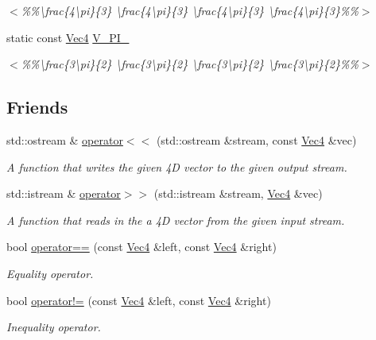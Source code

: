 \begin{DoxyCompactItemize}
\begin{DoxyCompactList}\small\item\em $<$\%\%\textbackslash{}frac\{4\textbackslash{}pi\}\{3\} \textbackslash{}frac\{4\textbackslash{}pi\}\{3\} \textbackslash{}frac\{4\textbackslash{}pi\}\{3\} \textbackslash{}frac\{4\textbackslash{}pi\}\{3\}\%\%$>$ \end{DoxyCompactList}\item 
\hypertarget{classgfxmath_1_1_vec4_a8e5758b556bdb951580e477b23d00223}{}static const \hyperlink{classgfxmath_1_1_vec4}{Vec4} \hyperlink{classgfxmath_1_1_vec4_a8e5758b556bdb951580e477b23d00223}{V\+\_\+P\+I\+\_}\label{classgfxmath_1_1_vec4_a8e5758b556bdb951580e477b23d00223}

\begin{DoxyCompactList}\small\item\em $<$\%\%\textbackslash{}frac\{3\textbackslash{}pi\}\{2\} \textbackslash{}frac\{3\textbackslash{}pi\}\{2\} \textbackslash{}frac\{3\textbackslash{}pi\}\{2\} \textbackslash{}frac\{3\textbackslash{}pi\}\{2\}\%\%$>$ \end{DoxyCompactList}\end{DoxyCompactItemize}
\subsection*{Friends}
\begin{DoxyCompactItemize}
\item 
std\+::ostream \& \hyperlink{classgfxmath_1_1_vec4_aca7a827b7b4687b9457299e967ebf5e0}{operator$<$$<$} (std\+::ostream \&stream, const \hyperlink{classgfxmath_1_1_vec4}{Vec4} \&vec)
\begin{DoxyCompactList}\small\item\em A function that writes the given 4\+D vector to the given output stream. \end{DoxyCompactList}\item 
std\+::istream \& \hyperlink{classgfxmath_1_1_vec4_abe7dbc999f3cc071e5a4c64c18f95e2c}{operator$>$$>$} (std\+::istream \&stream, \hyperlink{classgfxmath_1_1_vec4}{Vec4} \&vec)
\begin{DoxyCompactList}\small\item\em A function that reads in the a 4\+D vector from the given input stream. \end{DoxyCompactList}\item 
bool \hyperlink{classgfxmath_1_1_vec4_a75ec0a4eb1bdb2abb83280b62f2e94d3}{operator==} (const \hyperlink{classgfxmath_1_1_vec4}{Vec4} \&left, const \hyperlink{classgfxmath_1_1_vec4}{Vec4} \&right)
\begin{DoxyCompactList}\small\item\em Equality operator. \end{DoxyCompactList}\item 
bool \hyperlink{classgfxmath_1_1_vec4_a8ddc017b9087be64efa4fc76f1f63a12}{operator!=} (const \hyperlink{classgfxmath_1_1_vec4}{Vec4} \&left, const \hyperlink{classgfxmath_1_1_vec4}{Vec4} \&right)
\begin{DoxyCompactList}\small\item\em Inequality operator. \end{DoxyCompactList}\end{DoxyCompactItemize}
